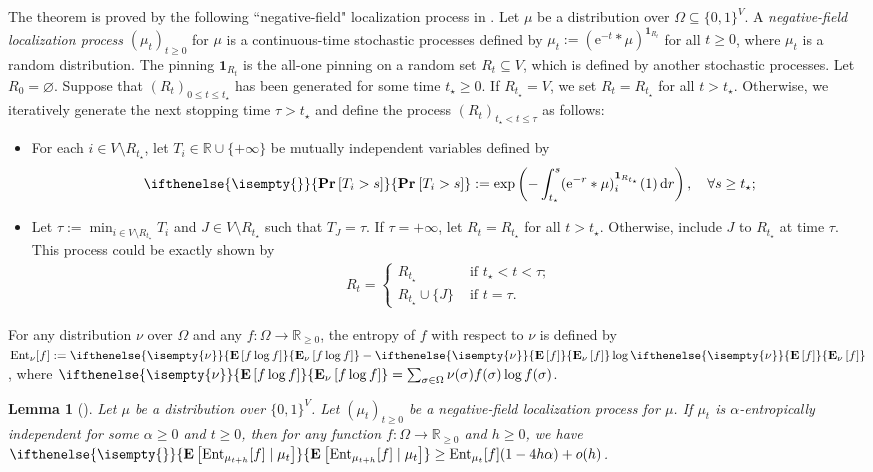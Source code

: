 \documentclass[11pt,a4paper]{article}
\newcommand{\e}{\mathrm{e}}
\newtheorem{lemma}[theorem]{Lemma}
\theoremstyle{definition}
\def\Pr{\mathop{\mathbf{Pr}}\nolimits}
\renewcommand{\emptyset}{\varnothing}
\renewcommand{\d}{\,\-d}
\def\*#1{\mathbf{#1}} %
\def\-#1{\mathrm{#1}} %
\renewcommand{\Pr}[2][]{ \ifthenelse{\isempty{#1}}
  {\mathbf{Pr}\left[#2\right]} {\mathbf{Pr}_{#1}\left[#2\right]} } %
\newcommand{\E}[2][]{ \ifthenelse{\isempty{#1}}
  {\mathbf{\mathbf{E}}\left[#2\right]}
  {\mathbf{\mathbf{E}}_{#1}\left[#2\right]} }
\begin{document}
The theorem is proved by the following ``negative-field" localization process in \cite{ChenE22}.
Let $\mu$ be a distribution over $\Omega \subseteq \{0,1\}^V$. A \emph{negative-field localization process} $(\mu_t)_{t\geq 0}$ for $\mu$ is a continuous-time stochastic processes defined by $\mu_t:=(\e^{-t}*\mu)^{\*1_{R_t}}$ for all $t\geq 0$, where $\mu_t$ is a random distribution. The pinning $\*1_{R_t}$ is the all-one pinning on a random set $R_t\subseteq V$, which is defined by another stochastic processes.
Let $R_0=\emptyset$. Suppose that $(R_t)_{0\leq t\leq t_\star}$ has been generated for some time $t_\star\geq 0$.
If $R_{t_\star}=V$, we set $R_t=R_{t_\star}$ for all $t>t_\star$.
Otherwise, we iteratively generate the next stopping time $\tau>t_\star$ and define the process $(R_t)_{t_\star<t\leq \tau}$ as follows:  
\begin{itemize}
\item For each $i\in V\setminus R_{t_\star}$, let $T_i \in \mathbb{R} \cup \{+\infty\}$ be mutually independent variables defined by 
\begin{align*}
    \Pr[]{T_i> s}:=\exp\left(-\int_{t_\star}^s (\e^{-r} * \mu)_i^{\*1_{R_{t_\star}}}(1) \d r\right),\quad \forall s\geq t_\star;
\end{align*}
\item
Let $\tau:=\min_{i\in V\setminus R_{t_\star}}T_i$ and $J \in V\setminus R_{t_\star}$ such that $T_J = \tau$. If $\tau = +\infty$, let $R_t=R_{t_\star}$ for all $t>t_\star$. Otherwise, include $J$ to $R_{t_\star}$ at time $\tau$. This process could be exactly shown by 
\begin{align*}
         R_t = \begin{cases}
            R_{t_\star} & \text{ if } t_\star<t<\tau;\\
            R_{t_\star}\cup \{J\} & \text{ if } t = \tau.
        \end{cases}
    \end{align*}
\end{itemize}

For any distribution $\nu$ over $\Omega$ and any $f:\Omega\to \mathbb{R}_{\geq 0}$, the entropy of $f$ with respect to $\nu$ is defined by $\textnormal{Ent}_\nu[f]:=\E[\nu]{f\log f}-\E[\nu]{f}\log \E[\nu]{f}$, where $\E[\nu]{f\log f} = \sum_{\sigma\in \Omega} \nu(\sigma) f(\sigma)\log f(\sigma)$.


\begin{lemma}[]\label{lem:Ent-t-t+h}
Let $\mu$ be a distribution over $\{0,1\}^V$. Let $(\mu_t)_{t\geq 0}$ be a negative-field localization process for $\mu$. If $\mu_t$ is $\alpha$-entropically independent for some $ \alpha \geq 0$ and $t \geq 0$, then for any function $f:\Omega \to \mathbb{R}_{\geq 0}$ and $h\geq 0$, we have $\E[]{\textnormal{Ent}_{\mu_{t+h}}[f]\mid \mu_t} \geq \textnormal{Ent}_{\mu_t}[f](1-4h\alpha)+o(h)$.
\end{lemma}
\end{document}
